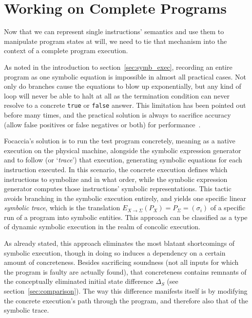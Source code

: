 \section{Working on Complete Programs}\label{sec:concolic_tracing}

Now that we can represent single instructions' semantics and use them to manipulate program states at will, we need to
tie that mechanism into the context of a complete program execution.

As noted in the introduction to section~\ref{sec:symb_exec}, recording an entire program as one symbolic equation is
impossible in almost all practical cases. Not only do branches cause the equations to blow up exponentially, but any
kind of loop will never be able to halt at all as the termination condition can never resolve to a concrete
\texttt{true} or \texttt{false} answer. This limitation has been pointed out before many times, and the practical
solution is always to sacrifice accuracy (allow false positives or false negatives or both) for
performance~\cite{Baldoni2018SymbexecSurvey}.

Focaccia's solution is to run the test program concretely, meaning as a native execution on the physical machine,
alongside the symbolic expression generator and to follow (or `\textit{trace}') that execution, generating symbolic
equations for each instruction executed. In this scenario, the concrete execution defines which instructions to
symbolize and in what order, while the symbolic expression generator computes those instructions' symbolic
representations. This tactic avoids branching in the symbolic execution entirely, and yields one specific linear
\textit{symbolic trace}, which is the translation $E_{X \rightarrow \Sigma}(P_X) = P_\Sigma = (\sigma_i)$ of a specific
run of a program into symbolic entities. This approach can be classified as a type of dynamic symbolic execution in the
realm of concolic execution.

As already stated, this approach eliminates the most blatant shortcomings of symbolic execution, though in doing so
induces a dependency on a certain amount of concreteness. Besides sacrificing soundness (not all inputs for which the
program is faulty are actually found), that concreteness contains remnants of the conceptually eliminated initial state
difference $\Delta_S$ (see section~\ref{sec:comparison}). The way this difference manifests itself is by modifying the
concrete execution's path through the program, and therefore also that of the symbolic trace.

